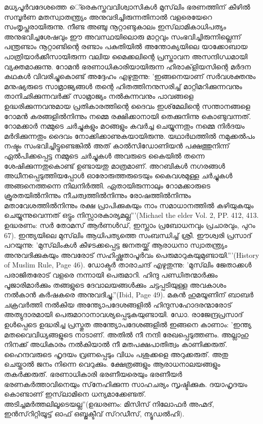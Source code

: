 മധ്യപൂര്‍വദേശത്തെ െ്രെകസ്തവവിശ്വാസികള്‍ മുസ്‌ലിം ഭരണത്തിന് കീഴില്‍ സമ്പൂര്‍ണ മതസ്വാതന്ത്യ്രം അനുവദിച്ചിരുന്നതിനാല്‍ വളരെയേറെ സംതൃപ്തരായിരുന്നു. നീണ്ട അഞ്ചു നൂറ്റാണ്ടുകാലം ഇസ്‌ലാമികാധിപത്യം അനുഭവിച്ചശേഷവും ഈ അവസ്ഥയിലൊരു മാറ്റവും സംഭവിച്ചിരുന്നില്ലെന്ന് പന്ത്രണ്ടാം നൂറ്റാണ്ടിന്റെ രണ്ടാം പകുതിയില്‍ അന്തോക്യയിലെ യാക്കോബായ പാത്രിയാര്‍ക്കീസായിരുന്ന വലിയ മൈക്കലിന്റെ പ്രസ്താവന അസന്ദിഗ്ധമായി വ്യക്തമാക്കുന്നു. റോമന്‍ ഭരണാധികാരിയായിരുന്ന ഹിരാക്‌ളിയസിന്റെ മര്‍ദന കഥകള്‍ വിവരിച്ചുകൊണ്ട് അദ്ദേഹം എഴുതുന്നു: 'ഇങ്ങനെയാണ് സര്‍വശക്തനും മനുഷ്യരുടെ സാമ്രാജ്യങ്ങള്‍ തന്റെ ഹിതത്തിനനുസരിച്ച് മാറ്റിമറിക്കുന്നവനും താനിഛിക്കുന്നവര്‍ക്ക് സാമ്രാജ്യം നല്‍കുന്നവനും പാവങ്ങളെ ഉദ്ധരിക്കുന്നവനുമായ പ്രതികാരത്തിന്റെ ദൈവം ഇശ്‌മേലിന്റെ സന്താനങ്ങളെ റോമന്‍ കരങ്ങളില്‍നിന്നും നമ്മെ രക്ഷിക്കാനായി തെക്കുനിന്നു കൊണ്ടുവന്നത്. റോമക്കാര്‍ നമ്മുടെ ചര്‍ച്ചുകളും മഠങ്ങളും കവര്‍ച്ച ചെയ്യുന്നതും നമ്മെ നിര്‍ദയം മര്‍ദിക്കുന്നതും ദൈവം നോക്കിക്കാണുകയായിരുന്നു. യഥാര്‍ഥത്തില്‍ നമുക്കല്‍പം നഷ്ടം സംഭവിച്ചിട്ടുണ്ടെങ്കില്‍ അത് കാല്‍സിഡോണിയന്‍ പക്ഷത്തുനിന്ന് ഏല്‍പിക്കപ്പെട്ട നമ്മുടെ ചര്‍ച്ചുകള്‍ അവരുടെ കൈയില്‍ തന്നെ ശേഷിക്കുന്നതുകൊണ്ട് ഉണ്ടായതു മാത്രമാണ്. അറബികള്‍ നഗരങ്ങള്‍ അധീനപ്പെടുത്തിയപ്പോള്‍ ഓരോരുത്തരുടെയും കൈവശമുള്ള ചര്‍ച്ചുകള്‍ അങ്ങനെത്തന്നെ നിലനിര്‍ത്തി. ഏതായിരുന്നാലും റോമക്കാരുടെ ക്രൂരതയില്‍നിന്നും നീചത്വത്തില്‍നിന്നും രോഷത്തില്‍നിന്നും മതാവേശത്തില്‍നിന്നും രക്ഷ പ്രാപിക്കുകയും നാം സമാധാനത്തില്‍ കഴിയുകയും ചെയ്യുന്നുവെന്നത് ഒട്ടും നിസ്സാരകാര്യമല്ല'''(Michael the elder Vol. 2, PP. 412, 413. ഉദ്ധരണം: സര്‍ തോമസ് ആര്‍ണള്‍ഡ്, ഇസ്ലാം പ്രബോധനവും പ്രചാരവും, പുറം 67).
ഇന്ത്യയിലെ മുസ്‌ലിം ആധിപത്യത്തെ സംബന്ധിച്ച് ശ്രീ. ഈശ്വരി പ്രസാദ് പറയുന്നു: 'മുസ്‌ലിംകള്‍ കീഴടക്കപ്പെട്ട ജനതയ്ക്ക് ആരാധനാ സ്വാതന്ത്യ്രം അനുവദിക്കുകയും അവരോട് സഹിഷ്ണുതാപൂര്‍വം പെരുമാറുകയുമുണ്ടായി.'''(History of Muslim Rule, Page 46).
ഡോക്ടര്‍ താരാചന്ദ് എഴുതുന്നു: 'മുസ്‌ലിം ജേതാക്കള്‍ പരാജിതരോട് വളരെ നന്നായി പെരുമാറി. ഹിന്ദു പണ്ഡിതന്മാര്‍ക്കും പൂജാരിമാര്‍ക്കും തങ്ങളുടെ ദേവാലയങ്ങള്‍ക്കും ചട്ടപ്പടിയുള്ള അവകാശം നല്‍കാന്‍ കര്‍ഷകരെ അനുവദിച്ചു.''(Ibid, Page 49).
മകന്‍ ഹുമയൂണിന് ബാബര്‍ ചക്രവര്‍ത്തി നല്‍കിയ അന്ത്യോപദേശങ്ങളില്‍ ഹിന്ദുസഹോദരന്മാരോട് അത്യുദാരമായി പെരുമാറാനാവശ്യപ്പെടുകയുണ്ടായി. ഡോ. രാജേന്ദ്രപ്രസാദ് ഉള്‍പ്പെടെ ഉദ്ധരിച്ച പ്രസ്തുത അന്ത്യോപദേശങ്ങളില്‍ ഇങ്ങനെ കാണാം: 'ഇന്ത്യ മതവൈവിധ്യങ്ങളുടെ നാടാണ്. അതില്‍ നീ നന്ദി രേഖപ്പെടുത്തണം. അല്ലാഹു നിനക്ക് അധികാരം നല്‍കിയാല്‍ നീ മതപക്ഷപാതിത്വം കാണിക്കരുത്. ഹൈന്ദവരുടെ ഹൃദയം വ്രണപ്പെടും വിധം പശുക്കളെ അറുക്കരുത്. അതു ചെയ്താല്‍ ജനം നിന്നെ വെറുക്കും. ക്ഷേത്രങ്ങളും ആരാധനാലയങ്ങളും തകര്‍ക്കരുത്. ഭരണാധികാരി ഭരണീയരെയും ഭരണീയര്‍ ഭരണകര്‍ത്താവിനെയും സ്‌നേഹിക്കുന്ന സാഹചര്യം സൃഷ്ടിക്കുക. ദയാഹൃദയം കൊണ്ടാണ് ഇസ്‌ലാമിനെ ധന്യമാക്കേണ്ടത്. അടിച്ചമര്‍ത്തലിലൂടെയല്ല''(ഉദ്ധരണം: മിസിസ് നിലോഫര്‍ അഹ്മദ്, ഇന്‍സ്‌റിറ്റിയൂട്ട് ഓഫ് ഒബ്ജക്ടീവ് സ്‌റഡീസ്, ന്യൂഡല്‍ഹി).
